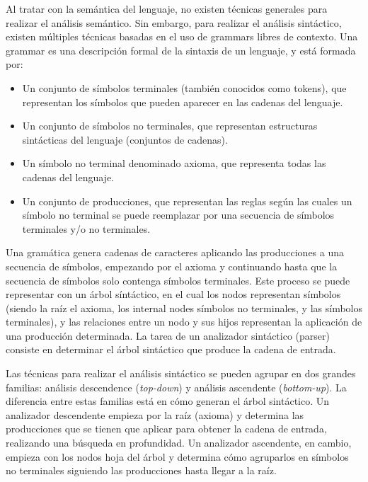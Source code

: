Al tratar con la semántica del lenguaje, no existen técnicas generales para
realizar el análisis semántico. Sin embargo, para realizar el análisis
sintáctico, existen múltiples técnicas basadas en el uso de \glspl{grammar}
libres de contexto. Una \gls{grammar} es una descripción formal de la sintaxis
de un lenguaje, y está formada por: \parencite{dragon-book}

\begin{itemize}
    \item Un conjunto de símbolos terminales (también conocidos como
    \glspl{token}), que representan los símbolos que pueden aparecer en las
    cadenas del lenguaje.
    \item Un conjunto de símbolos no terminales, que representan estructuras
    sintácticas del lenguaje (conjuntos de cadenas).
    \item Un símbolo no terminal denominado axioma, que representa todas las
    cadenas del lenguaje.
    \item Un conjunto de producciones, que representan las reglas según las
    cuales un símbolo no terminal se puede reemplazar por una secuencia de
    símbolos terminales y/o no terminales.
\end{itemize}

Una gramática genera cadenas de caracteres aplicando las producciones a una
secuencia de símbolos, empezando por el axioma y continuando hasta que la
secuencia de símbolos solo contenga símbolos terminales. Este proceso se puede
representar con un árbol síntáctico, en el cual los nodos representan símbolos
(siendo la raíz el axioma, los \glspl{internal node} símbolos no terminales, y
las  símbolos terminales), y las relaciones entre un
nodo y sus hijos representan la aplicación de una producción determinada. La
tarea de un analizador sintáctico (\gls{parser}) consiste en determinar el árbol
sintáctico que produce la cadena de entrada. \parencite{dragon-book}

Las técnicas para realizar el análisis sintáctico se pueden agrupar en dos
grandes familias: análisis descendence (\textit{top-down}) y análisis ascendente
(\textit{bottom-up}). La diferencia entre estas familias está en cómo generan el
árbol sintáctico. Un analizador descendente empieza por la raíz (axioma) y
determina las producciones que se tienen que aplicar para obtener la cadena de
entrada, realizando una búsqueda en profundidad. Un analizador ascendente, en
cambio, empieza con los nodos hoja del árbol y determina cómo agruparlos en
símbolos no terminales siguiendo las producciones hasta llegar a la raíz.
\parencite{dragon-book}

